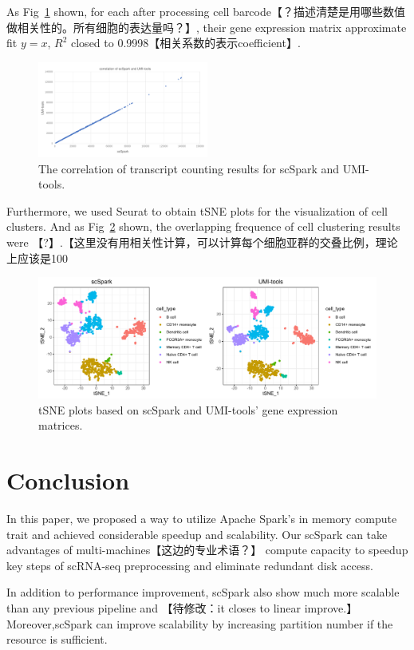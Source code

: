\documentclass[conference]{IEEEtran}
\begin{document}
  As Fig~\ref{fig9} shown, for each after processing cell barcode【？描述清楚是用哪些数值做相关性的。所有细胞的表达量吗？】, their gene expression matrix approximate fit $y=x$, $R^{2}$ closed to 0.9998【相关系数的表示coefficient】. 
  \begin{figure}
    \includegraphics[width=0.5\textwidth]{fig9.pdf}
    \caption{The correlation of transcript counting results for scSpark and UMI-tools.} \label{fig9}
  \end{figure}
  Furthermore, we used Seurat to obtain tSNE plots for the visualization of cell clusters. 
  And as Fig~\ref{fig10} shown, the overlapping frequence of cell clustering results were 【?】.【这里没有用相关性计算，可以计算每个细胞亚群的交叠比例，理论上应该是100%
  \begin{figure}
    \includegraphics[width=\textwidth]{fig10.pdf}
    \caption{tSNE plots based on scSpark and UMI-tools' gene expression matrices.} \label{fig10}
  \end{figure}
  \section{Conclusion}
  In this paper, we proposed a way to utilize Apache Spark's in memory compute trait and achieved considerable speedup and scalability. 
  Our scSpark can take advantages of multi-machines【这边的专业术语？】 compute capacity to speedup key steps of scRNA-seq preprocessing and eliminate redundant disk access. 
  
  In addition to performance improvement, scSpark also show much more scalable than any previous pipeline and 【待修改：it closes to linear improve.】
  Moreover,scSpark can improve scalability by increasing partition number if the resource is sufficient.
  
\end{document}
